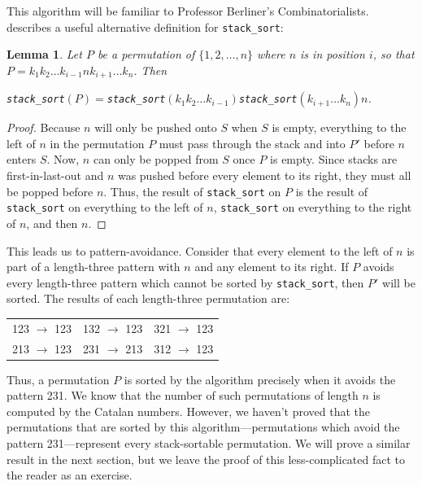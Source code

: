 \documentclass[12pt]{article}
\newtheorem{lem}{Lemma} %
\begin{document}
This algorithm will be familiar to Professor Berliner's Combinatorialists. \cite{Bona2003} describes a useful alternative definition for \texttt{stack\_sort}: 

\begin{lem}
Let $P$ be a permutation of $\{1,2,\ldots,n\}$ where $n$ is in position $i$, so that $P=k_1k_2\ldots k_{i-1}nk_{i+1}\ldots k_n$. Then \begin{center}\texttt{stack\_sort}$(P)=$\texttt{stack\_sort}$(k_1k_2\ldots k_{i-1})$\texttt{stack\_sort}$(k_{i+1}\ldots k_n)n$.
\end{center}
\end{lem}
\begin{proof}
Because $n$ will only be pushed onto $S$ when $S$ is empty, everything to the left of $n$ in the permutation $P$ must pass through the stack and into $P'$ before $n$ enters $S$. Now, $n$ can only be popped from $S$ once $P$ is empty. Since stacks are first-in-last-out and $n$ was pushed before every element to its right, they must all be popped before $n$. Thus, the result of \texttt{stack\_sort} on $P$ is the result of \texttt{stack\_sort} on everything to the left of $n$, \texttt{stack\_sort} on everything to the right of $n$, and then $n$. 
\end{proof}

This leads us to pattern-avoidance. Consider that every element to the left of $n$ is part of a length-three pattern with $n$ and any element to its right. If $P$ avoids every length-three pattern which cannot be sorted by \texttt{stack\_sort}, then $P'$ will be sorted. The results of each length-three permutation are:
\begin{table}[H]
    \centering
    \begin{tabular}{ccc}
        123 $\to$ 123 & 132 $\to$ 123 & 321 $\to$ 123 \\
        213 $\to$ 123 & 231 $\to$ 213 & 312 $\to$ 123
    \end{tabular}
\end{table}

Thus, a permutation $P$ is sorted by the algorithm precisely when it avoids the pattern 231. We know that the number of such permutations of length $n$ is computed by the Catalan numbers. However, we haven't proved that the permutations that are sorted by this algorithm---permutations which avoid the pattern 231---represent every stack-sortable permutation. We will prove a similar result in the next section, but we leave the proof of this less-complicated fact to the reader as an exercise.
\end{document}
